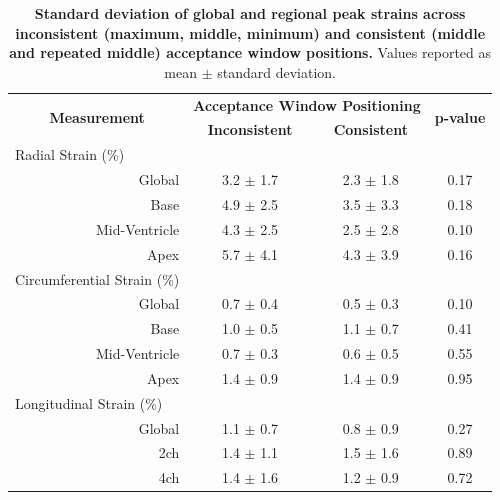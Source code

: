 	\begin{table}
		\centering
		\caption[Standard deviation of global and regional peak strains across inconsistent (maximum, middle, minimum) and consistent (middle and repeated middle) acceptance window positions]{\textbf{Standard deviation of global and regional peak strains across inconsistent (maximum, middle, minimum) and consistent (middle and repeated middle) acceptance window positions.} Values reported as mean $\pm$ standard deviation.}
		\label{table:strainInconsVsCons}
		\begin{tabular}{c c c c}
			\toprule
			\multirow{2}{*}{\textbf{Measurement}} & \multicolumn{2}{c}{\textbf{Acceptance Window Positioning}} & \multirow{2}{*}{\textbf{p-value}}  \\ 
			& \textbf{Inconsistent} & \textbf{Consistent} & \\
			\midrule
			\multicolumn{1}{l}{Radial Strain (\%)} & & &   \\
			\multicolumn{1}{r}{Global}  	  & 3.2 $\pm$ 1.7 &	2.3 $\pm$ 1.8 &	0.17 \\
			\multicolumn{1}{r}{Base}  		  & 4.9 $\pm$ 2.5 & 3.5 $\pm$ 3.3 & 0.18 \\
			\multicolumn{1}{r}{Mid-Ventricle} & 4.3 $\pm$ 2.5 & 2.5 $\pm$ 2.8 & 0.10 \\
			\multicolumn{1}{r}{Apex}  		  & 5.7 $\pm$ 4.1 & 4.3 $\pm$ 3.9 & 0.16 \\
			\multicolumn{1}{l}{Circumferential Strain (\%)} & & &	\\
			\multicolumn{1}{r}{Global}  	  & 0.7 $\pm$ 0.4 & 0.5 $\pm$ 0.3 & 0.10 \\
			\multicolumn{1}{r}{Base}  		  & 1.0 $\pm$ 0.5 & 1.1 $\pm$ 0.7 & 0.41 \\
			\multicolumn{1}{r}{Mid-Ventricle} & 0.7 $\pm$ 0.3 & 0.6 $\pm$ 0.5 & 0.55 \\	   			
			\multicolumn{1}{r}{Apex}          & 1.4 $\pm$ 0.9 & 1.4 $\pm$ 0.9 & 0.95 \\
			\multicolumn{1}{l}{Longitudinal Strain (\%)} & & &								    				  \\
			\multicolumn{1}{r}{Global}        & 1.1 $\pm$ 0.7 & 0.8 $\pm$ 0.9 & 0.27  \\
			\multicolumn{1}{r}{2ch}  		  & 1.4 $\pm$ 1.1 & 1.5 $\pm$ 1.6  & 0.89  \\
			\multicolumn{1}{r}{4ch}  		  & 1.4 $\pm$ 1.6 & 1.2 $\pm$ 0.9  & 0.72  \\ 
			\bottomrule
		\end{tabular}
	\end{table}


